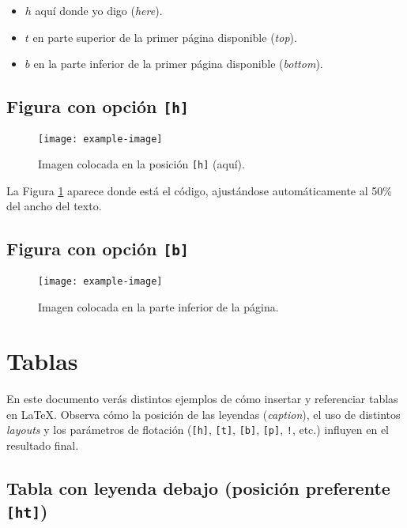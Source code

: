 \documentclass[12pt]{article}
\begin{document}
\begin{itemize}
\item $h$ aquí donde yo digo (\textit{here}). 
\item $t$ en parte superior de la primer página disponible (\textit{top}). 
\item $b$ en la parte inferior de la primer página disponible (\textit{bottom}). 
\end{itemize}

\subsection{Figura con opción \texttt{[h]}}



\lipsum[4]

\begin{figure}[h] %
    \centering
    \texttt{[image: example-image]}
    \caption{Imagen colocada en la posición \texttt{[h]} (aquí).}
    \label{fig:h}
\end{figure}

La Figura \ref{fig:h} aparece donde está el código, ajustándose automáticamente al 50\% del ancho del texto.

\lipsum[4]

\subsection{Figura con opción \texttt{[b]}}

\lipsum[4]

\begin{figure}[b!] %
    \centering
    \texttt{[image: example-image]}
    \caption{Imagen colocada en la parte inferior de la página.}
    \label{fig:b}
\end{figure}


\section{Tablas}

En este documento verás distintos ejemplos de cómo insertar y 
referenciar tablas en \LaTeX. Observa cómo la posición de las leyendas 
(\emph{caption}), el uso de distintos \emph{layouts} y los parámetros 
de flotación (\texttt{[h]}, \texttt{[t]}, \texttt{[b]}, \texttt{[p]}, \texttt{!}, etc.) 
influyen en el resultado final.

\subsection{Tabla con leyenda debajo (posición preferente \texttt{[ht]})}
\end{document}
